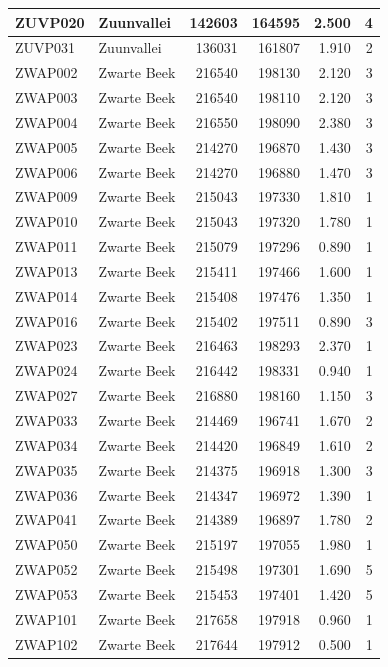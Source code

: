 \documentclass[11pt,]{book}
\begin{document}
\begin{table}
\begin{tabular}[t]{l|l|r|r|r|r}
\hline
ZUVP020 & Zuunvallei & 142603 & 164595 & 2.500 & 4\\
\hline
ZUVP031 & Zuunvallei & 136031 & 161807 & 1.910 & 2\\
\hline
ZWAP002 & Zwarte Beek & 216540 & 198130 & 2.120 & 3\\
\hline
ZWAP003 & Zwarte Beek & 216540 & 198110 & 2.120 & 3\\
\hline
ZWAP004 & Zwarte Beek & 216550 & 198090 & 2.380 & 3\\
\hline
ZWAP005 & Zwarte Beek & 214270 & 196870 & 1.430 & 3\\
\hline
ZWAP006 & Zwarte Beek & 214270 & 196880 & 1.470 & 3\\
\hline
ZWAP009 & Zwarte Beek & 215043 & 197330 & 1.810 & 1\\
\hline
ZWAP010 & Zwarte Beek & 215043 & 197320 & 1.780 & 1\\
\hline
ZWAP011 & Zwarte Beek & 215079 & 197296 & 0.890 & 1\\
\hline
ZWAP013 & Zwarte Beek & 215411 & 197466 & 1.600 & 1\\
\hline
ZWAP014 & Zwarte Beek & 215408 & 197476 & 1.350 & 1\\
\hline
ZWAP016 & Zwarte Beek & 215402 & 197511 & 0.890 & 3\\
\hline
ZWAP023 & Zwarte Beek & 216463 & 198293 & 2.370 & 1\\
\hline
ZWAP024 & Zwarte Beek & 216442 & 198331 & 0.940 & 1\\
\hline
ZWAP027 & Zwarte Beek & 216880 & 198160 & 1.150 & 3\\
\hline
ZWAP033 & Zwarte Beek & 214469 & 196741 & 1.670 & 2\\
\hline
ZWAP034 & Zwarte Beek & 214420 & 196849 & 1.610 & 2\\
\hline
ZWAP035 & Zwarte Beek & 214375 & 196918 & 1.300 & 3\\
\hline
ZWAP036 & Zwarte Beek & 214347 & 196972 & 1.390 & 1\\
\hline
ZWAP041 & Zwarte Beek & 214389 & 196897 & 1.780 & 2\\
\hline
ZWAP050 & Zwarte Beek & 215197 & 197055 & 1.980 & 1\\
\hline
ZWAP052 & Zwarte Beek & 215498 & 197301 & 1.690 & 5\\
\hline
ZWAP053 & Zwarte Beek & 215453 & 197401 & 1.420 & 5\\
\hline
ZWAP101 & Zwarte Beek & 217658 & 197918 & 0.960 & 1\\
\hline
ZWAP102 & Zwarte Beek & 217644 & 197912 & 0.500 & 1\\

\end{tabular}
\end{table}
\end{document}
